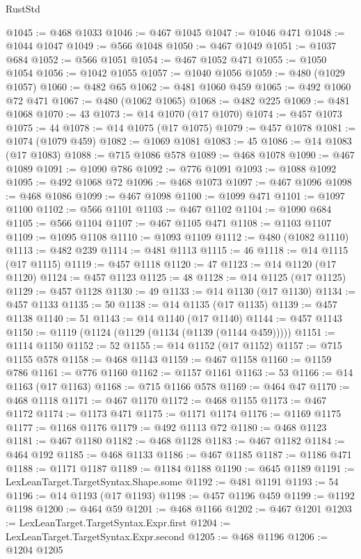 \begin{lexlean}{RustStd}
\begin{coremodule}
@1045 := @468 @1033
@1046 := @467 @1045
@1047 := @1046 @471
@1048 := @1044 @1047
@1049 := @566 @1048
@1050 := @467 @1049
@1051 := @1037 @684
@1052 := @566 @1051
@1054 := @467 @1052 @471
@1055 := @1050 @1054
@1056 := @1042 @1055
@1057 := @1040 @1056
@1059 := @480 (@1029 @1057)
@1060 := @482 @65
@1062 := @481 @1060 @459
@1065 := @492 @1060 @72 @471
@1067 := @480 (@1062 @1065)
@1068 := @482 @225
@1069 := @481 @1068
@1070 := 43
@1073 := @14 @1070 (@17 @1070)
@1074 := @457 @1073
@1075 := 44
@1078 := @14 @1075 (@17 @1075)
@1079 := @457 @1078
@1081 := @1074 (@1079 @459)
@1082 := @1069 @1081
@1083 := 45
@1086 := @14 @1083 (@17 @1083)
@1088 := @715 @1086 @578
@1089 := @468 @1078
@1090 := @467 @1089
@1091 := @1090 @786
@1092 := @776 @1091
@1093 := @1088 @1092
@1095 := @492 @1068 @72
@1096 := @468 @1073
@1097 := @467 @1096
@1098 := @468 @1086
@1099 := @467 @1098
@1100 := @1099 @471
@1101 := @1097 @1100
@1102 := @566 @1101
@1103 := @467 @1102
@1104 := @1090 @684
@1105 := @566 @1104
@1107 := @467 @1105 @471
@1108 := @1103 @1107
@1109 := @1095 @1108
@1110 := @1093 @1109
@1112 := @480 (@1082 @1110)
@1113 := @482 @239
@1114 := @481 @1113
@1115 := 46
@1118 := @14 @1115 (@17 @1115)
@1119 := @457 @1118
@1120 := 47
@1123 := @14 @1120 (@17 @1120)
@1124 := @457 @1123
@1125 := 48
@1128 := @14 @1125 (@17 @1125)
@1129 := @457 @1128
@1130 := 49
@1133 := @14 @1130 (@17 @1130)
@1134 := @457 @1133
@1135 := 50
@1138 := @14 @1135 (@17 @1135)
@1139 := @457 @1138
@1140 := 51
@1143 := @14 @1140 (@17 @1140)
@1144 := @457 @1143
@1150 := @1119 (@1124 (@1129 (@1134 (@1139 (@1144 @459)))))
@1151 := @1114 @1150
@1152 := 52
@1155 := @14 @1152 (@17 @1152)
@1157 := @715 @1155 @578
@1158 := @468 @1143
@1159 := @467 @1158
@1160 := @1159 @786
@1161 := @776 @1160
@1162 := @1157 @1161
@1163 := 53
@1166 := @14 @1163 (@17 @1163)
@1168 := @715 @1166 @578
@1169 := @464 @47
@1170 := @468 @1118
@1171 := @467 @1170
@1172 := @468 @1155
@1173 := @467 @1172
@1174 := @1173 @471
@1175 := @1171 @1174
@1176 := @1169 @1175
@1177 := @1168 @1176
@1179 := @492 @1113 @72
@1180 := @468 @1123
@1181 := @467 @1180
@1182 := @468 @1128
@1183 := @467 @1182
@1184 := @464 @192
@1185 := @468 @1133
@1186 := @467 @1185
@1187 := @1186 @471
@1188 := @1171 @1187
@1189 := @1184 @1188
@1190 := @645 @1189
@1191 := LexLeanTarget.TargetSyntax.Shape.some
@1192 := @481 @1191
@1193 := 54
@1196 := @14 @1193 (@17 @1193)
@1198 := @457 @1196 @459
@1199 := @1192 @1198
@1200 := @464 @59
@1201 := @468 @1166
@1202 := @467 @1201
@1203 := LexLeanTarget.TargetSyntax.Expr.first
@1204 := LexLeanTarget.TargetSyntax.Expr.second
@1205 := @468 @1196
@1206 := @1204 @1205

\end{coremodule}
\end{lexlean}
